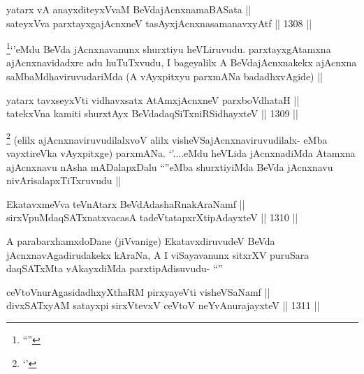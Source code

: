 
\begin{shl}
yatarx vA anayxditeyxVvaM BeVdajAcnxnamaBASata || \\
sateyxVva parxtayxgajAcnxneV tasAyxjAcnxnasamanavxyAtf ||  1308 ||  
\end{shl}

\begin{artha}
\footnote{``\stext''}`\stext'eMdu BeVda jAcnxnavanunx shurxtiyu heVLiruvudu. parxtayxgAtamxna ajAcnxnavidadxre adu huTuTxvudu, I bageyalilx A BeVdajAcnxnakekx ajAcnxna saMbaMdhaviruvudariMda (A vAyxpitxyu parxmANa badadhxvAgide) ||
\end{artha}

\begin{shl}
yatarx tavxseyxVti vidhavxsatx AtAmxjAcnxneV parxboVdhataH || \\
tatekxVna kamiti shurxtAyx BeVdadaqSiTxniRSidhayxteV ||  1309 ||  
\end{shl}

\begin{artha}
\footnote{`\stext'}
(elilx ajAcnxnaviruvudilalxvoV alilx visheVSajAcnxnaviruvudilalx- eMba vayxtireVka vAyxpitxge) parxmANa. `\stext'....eMdu heVLida jAcnxnadiMda Atamxna ajAcnxnavu nAsha mADalapxDalu ``\stext''eMba shurxtiyiMda BeVda jAcnxnavu nivArisalapxTiTxruvudu ||
\end{artha}


\begin{shl}
EkatavxmeVva teVnAtarx BeVdAdashaRnakAraNamf || \\
sirxVpuMdaqSATxnatxvacasA tadeVtatapxrXtipAdayxteV ||  1310 ||  
\end{shl}

\begin{artha}
A parabarxhamxdoDane (jiVvanige) EkatavxdiruvudeV BeVda jAcnxnavAgadirudakekx kAraNa, A I viSayavanunx sitxrXV puruSara daqSATxMta vAkayxdiMda parxtipAdisuvudu- ``\stext''
\end{artha}


\begin{shl}
ceVtoVnurAgasidadhxyXthaRM pirxyayeVti visheVSaNamf || \\
divxSATxyAM satayxpi sirxVtevxV ceVtoV neYvAnurajayxteV ||  1311 ||  
\end{shl}

